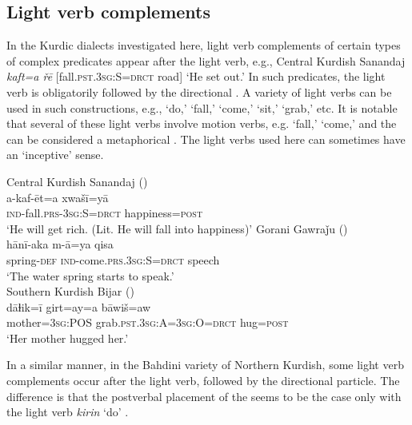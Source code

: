 \documentclass[output=paper,colorlinks,citecolor=brown]{langscibook}
\begin{document}
\begin{sloppypar}
\subsection{Light verb complements} \label{subs_lvc}
In the Kurdic dialects investigated here, light verb complements of certain types of complex predicates appear after the light verb, e.g., Central Kurdish Sanandaj \textit{kaft=a řē} [fall.\textsc{pst.3sg:S=drct} road] `He set out.' In such predicates, the light verb is obligatorily followed by the directional . A variety of light verbs can be used in such constructions, e.g., `do,' `fall,' `come,' `sit,' `grab,' etc. It is notable that several of these light verbs involve motion verbs, e.g. `fall,' `come,' and the  can be considered a metaphorical . The light verbs used here can sometimes have an `inceptive' sense. 

\ea
\ea\label{MGKC:ex:21a}
Central Kurdish Sanandaj (\citealt[D, 484]{mohammadirad_Sanandaj_Kurdish_2022}) \\
\gll a-kaf-ēt=a xwašī=yā \\
\textsc{ind}-fall.\textsc{prs-3sg:S=drct} happiness=\textsc{post} \\
\glt `He will get rich. (Lit. He will fall into happiness)'
\ex\label{MGKC:ex:21b}
Gorani Gawraǰu (\citealt[A, 0061]{mohammadirad_gorani_2022}) \\
\gll hānī-aka m-ā=ya qisa \\
spring-\textsc{def} \textsc{ind}-come.\textsc{prs.3sg:S=drct} speech \\
\glt `The water spring starts to speak.' \\
\ex\label{MGKC:ex:21c}
Southern Kurdish Bijar (\citealt[E, 677]{mohammadirad_Bijar_Kurdish_2022}) \\
\gll dāɫik=ī girt=ay=a bāwiš=aw\\
mother=\textsc{3sg:POS} grab.\textsc{pst.3sg:A=3sg:O=drct} hug=\textsc{post} \\
\glt `Her mother hugged her.'
\z
\z 

In a similar manner, in the Bahdini variety of Northern Kurdish, some light verb complements occur after the light verb, followed by the directional particle. The difference is that the postverbal placement of the  seems to be the case only with the light verb \textit{kirin} `do' \citep[cf.][344]{Haig2022PostPredicateCon}{}{}.


\end{sloppypar}
\end{document}
